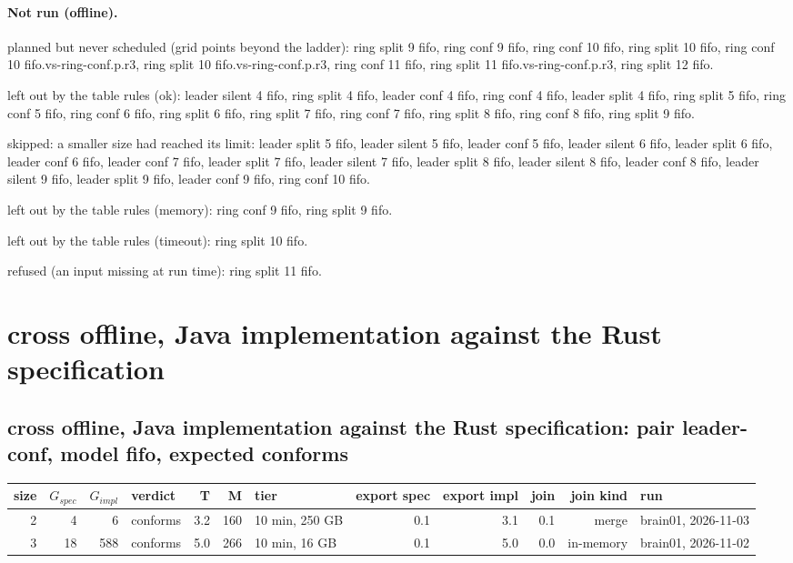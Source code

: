 \documentclass[10pt]{article}
\begin{document}
\paragraph{Not run (offline).}
planned but never scheduled (grid points beyond the ladder): ring split 9 fifo, ring conf 9 fifo, ring conf 10 fifo, ring split 10 fifo, ring conf 10 fifo.vs-ring-conf.p.r3, ring split 10 fifo.vs-ring-conf.p.r3, ring conf 11 fifo, ring split 11 fifo.vs-ring-conf.p.r3, ring split 12 fifo.\par
left out by the table rules (ok): leader silent 4 fifo, ring split 4 fifo, leader conf 4 fifo, ring conf 4 fifo, leader split 4 fifo, ring split 5 fifo, ring conf 5 fifo, ring conf 6 fifo, ring split 6 fifo, ring split 7 fifo, ring conf 7 fifo, ring split 8 fifo, ring conf 8 fifo, ring split 9 fifo.\par
skipped: a smaller size had reached its limit: leader split 5 fifo, leader silent 5 fifo, leader conf 5 fifo, leader silent 6 fifo, leader split 6 fifo, leader conf 6 fifo, leader conf 7 fifo, leader split 7 fifo, leader silent 7 fifo, leader split 8 fifo, leader silent 8 fifo, leader conf 8 fifo, leader silent 9 fifo, leader split 9 fifo, leader conf 9 fifo, ring conf 10 fifo.\par
left out by the table rules (memory): ring conf 9 fifo, ring split 9 fifo.\par
left out by the table rules (timeout): ring split 10 fifo.\par
refused (an input missing at run time): ring split 11 fifo.\par
\section*{cross offline, Java implementation against the Rust specification}
\subsection*{cross offline, Java implementation against the Rust specification: pair \textsf{leader-conf}, model fifo, expected conforms}
\begin{longtable}{@{}rrrlrrlrrrrl@{}}
\toprule
size & $G_{\mathit{spec}}$ & $G_{\mathit{impl}}$ & verdict & T & M & tier & export spec & export impl & join & join kind & run \\
\midrule
\endhead
\color{red} 2 & 4 & 6 & conforms & 3.2 & 160 & 10 min, 250 GB & 0.1 & 3.1 & 0.1 & merge & brain01, 2026-11-03 \\
\color{red} 3 & 18 & 588 & conforms & 5.0 & 266 & 10 min, 16 GB & 0.1 & 5.0 & 0.0 & in-memory & brain01, 2026-11-02 \\
\bottomrule
\end{longtable}
\end{document}
